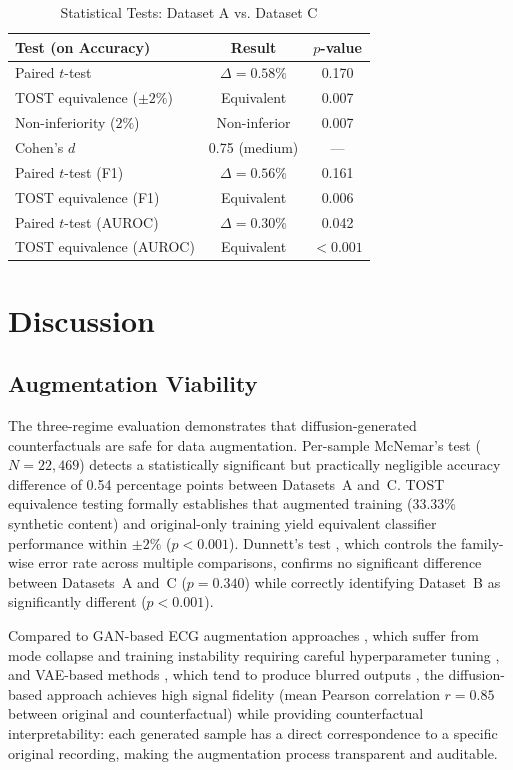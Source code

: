 \documentclass[conference]{IEEEtran}
\begin{document}
\begin{table}[t]
\centering
\caption{Statistical Tests: Dataset A vs. Dataset C}
\label{tab:stats}
\begin{tabular}{lcc}
\toprule
\textbf{Test (on Accuracy)} & \textbf{Result} & \textbf{$p$-value} \\
\midrule
Paired $t$-test              & $\Delta = 0.58\%$ & 0.170 \\
TOST equivalence ($\pm 2\%$) & Equivalent & 0.007 \\
Non-inferiority ($2\%$)      & Non-inferior & 0.007 \\
Cohen's $d$                  & 0.75 (medium) & --- \\
\midrule
Paired $t$-test (F1)         & $\Delta = 0.56\%$ & 0.161 \\
TOST equivalence (F1)        & Equivalent & 0.006 \\
Paired $t$-test (AUROC)      & $\Delta = 0.30\%$ & 0.042 \\
TOST equivalence (AUROC)     & Equivalent & $<0.001$ \\
\bottomrule
\end{tabular}
\end{table}


\section{Discussion}

\subsection{Augmentation Viability}

The three-regime evaluation demonstrates that diffusion-generated counterfactuals are safe for data augmentation. Per-sample McNemar's test ($N{=}22{,}469$) detects a statistically significant but practically negligible accuracy difference of 0.54 percentage points between Datasets~A and~C. TOST equivalence testing \cite{schuirmann1987comparison} formally establishes that augmented training (33.33\% synthetic content) and original-only training yield equivalent classifier performance within $\pm 2\%$ ($p{<}0.001$). Dunnett's test \cite{dunnett1955multiple}, which controls the family-wise error rate across multiple comparisons, confirms no significant difference between Datasets~A and~C ($p{=}0.340$) while correctly identifying Dataset~B as significantly different ($p{<}0.001$).

Compared to GAN-based ECG augmentation approaches \cite{delaney2019}, which suffer from mode collapse and training instability requiring careful hyperparameter tuning \cite{gulrajani2017}, and VAE-based methods \cite{kingma2014}, which tend to produce blurred outputs \cite{bredell2023}, the diffusion-based approach achieves high signal fidelity (mean Pearson correlation $r{=}0.85$ between original and counterfactual) while providing counterfactual interpretability: each generated sample has a direct correspondence to a specific original recording, making the augmentation process transparent and auditable.
\end{document}
